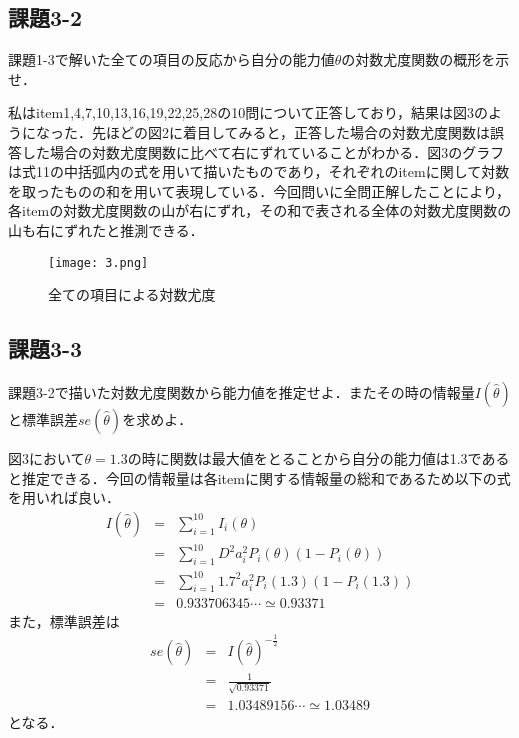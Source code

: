 \documentclass[12pt]{jarticle}
\begin{document}
\subsection{課題3-2}
\begin{shadebox}
    \quad 課題1-3で解いた全ての項目の反応から自分の能力値$\theta$の対数尤度関数の概形を示せ．
\end{shadebox}
\vspace{\baselineskip}
私はitem1,4,7,10,13,16,19,22,25,28の10問について正答しており，結果は図3のようになった．先ほどの図2に着目してみると，正答した場合の対数尤度関数は誤答した場合の対数尤度関数に比べて右にずれていることがわかる．図3のグラフは式11の中括弧内の式を用いて描いたものであり，それぞれのitemに関して対数を取ったものの和を用いて表現している．今回問いに全問正解したことにより，各itemの対数尤度関数の山が右にずれ，その和で表される全体の対数尤度関数の山も右にずれたと推測できる．
\begin{figure}[H]
    \begin{center}
        \texttt{[image: 3.png]}
    \end{center}
    \caption{全ての項目による対数尤度}
    \label{fig1}
\end{figure}
\subsection{課題3-3}
\begin{shadebox}
    \quad 課題3-2で描いた対数尤度関数から能力値を推定せよ．またその時の情報量$I(\hat{\theta})$と標準誤差$se(\hat{\theta})$を求めよ．
\end{shadebox}
\vspace{\baselineskip}
図3において$\theta=1.3$の時に関数は最大値をとることから自分の能力値は1.3であると推定できる．今回の情報量は各itemに関する情報量の総和であるため以下の式を用いれば良い．
\begin{eqnarray*}
    I(\hat{\theta})&=&\sum_{i=1}^{10}{I_i({\theta})}\\
    &=&\sum_{i=1}^{10}{D^2a_i^2P_i(\theta)(1-P_i(\theta))}\\
    &=&\sum_{i=1}^{10}{1.7^2a_i^2P_i(1.3)(1-P_i(1.3))}\\
    &=&0.933706345\cdots\simeq 0.93371
\end{eqnarray*}
また，標準誤差は
\begin{eqnarray*}
    se(\hat{\theta})&=&I(\hat{\theta})^{-\frac{1}{2}}\\
    &=&\frac{1}{\sqrt{0.93371}}\\
    &=&1.03489156\cdots\simeq 1.03489
\end{eqnarray*}
となる．
\end{document}
